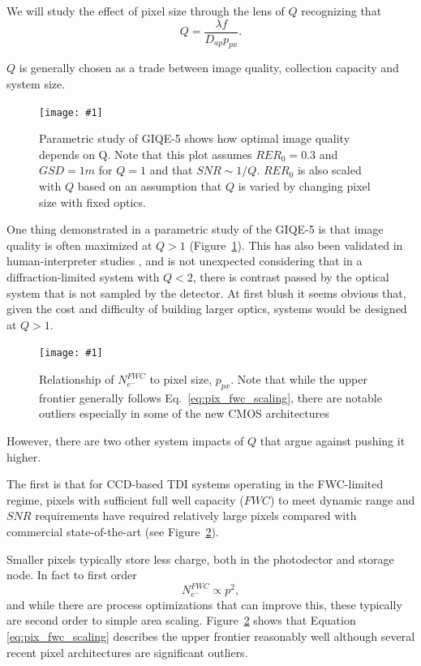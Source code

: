 \documentclass[]{spieman}  %
\newcommand{\includefigure}[3]
{
  \begin{figure}[h!tb]
  \centering
  \texttt{[image: \#1]}
  \caption[]{#3}
  \label{#2}
  \end{figure}
}
\begin{document}
We will study the effect of pixel size through the lens of $Q$ recognizing that \cite{fiete}
\begin{equation*}
    Q = \frac{\lambda f}{D_{ap} p_{px}}.
\end{equation*}


$Q$ is generally chosen as a trade between image quality, collection capacity and system size.  


\includefigure{figures/Q_iq.pgf}{fig:q_iq}{Parametric study of GIQE-5 shows how optimal image quality depends on Q.  Note that this plot assumes $RER_0 = 0.3$ and $GSD = 1m$ for $Q=1$ and that $SNR \sim 1 / Q$.  $RER_0$ is also scaled with $Q$ based on an assumption that $Q$ is varied by changing pixel size with fixed optics.}

One thing demonstrated in a parametric study of the GIQE-5 is that image quality is often maximized at $Q>1$ (Figure~\ref{fig:q_iq}).  This has also been validated in human-interpreter studies \cite{fiete_Q_IQ}, \cite{auelmann_iq} and is not unexpected considering that in a diffraction-limited system with $Q<2$, there is contrast passed by the optical system that is not sampled by the detector.  At first blush it seems obvious that, given the cost and difficulty of building larger optics, systems would be designed at $Q>1$.  

\includefigure{figures/p_fwc.pgf}{fig:p_fwc}{Relationship of $N_{e^-}^{FWC}$ to pixel size, $p_{px}$.  Note that while the upper frontier generally follows Eq.~\eqref{eq:pix_fwc_scaling}, there are notable outliers especially in some of the new CMOS architectures}

However, there are two other system impacts of $Q$ that argue against pushing it higher.

The first is that for CCD-based TDI systems operating in the FWC-limited regime, pixels with sufficient full well capacity ($FWC$) to meet dynamic range and $SNR$ requirements have required relatively large pixels compared with commercial state-of-the-art (see Figure~\ref{fig:p_fwc}).

Smaller pixels typically store less charge, both in the photodector and storage node. In fact to first order~\cite{jerram}
\begin{equation}
  \label{eq:pix_fwc_scaling}  
N_{e^-}^{FWC} \propto p^2,
\end{equation}
and while there are process optimizations that can improve this, these typically are second order to simple area scaling.  Figure~\ref{fig:p_fwc} shows that Equation \eqref{eq:pix_fwc_scaling} describes the upper frontier reasonably well although several recent pixel architectures are significant outliers.
\end{document}
